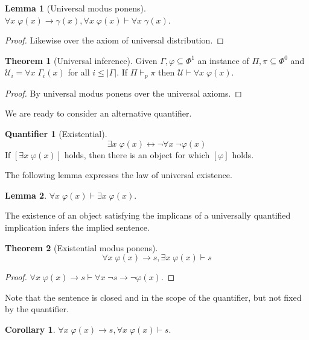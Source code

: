 \documentclass{amsbook}
\newcommand{\infers}{\mathrel\vdash}
\newcommand{\univ}[1]{\mathord\forall#1\;}
\newcommand{\exis}[1]{\mathord\exists#1\;}
\newcommand{\then}{\mathrel\rightarrow}
\newcommand{\eqv}{\mathrel\leftrightarrow}
\theoremstyle{definition}
\newtheorem{quant}{Quantifier}[chapter]
\newtheorem{thm}{Theorem}[section]
\newtheorem{lmm}{Lemma}[section]
\newtheorem{crl}{Corollary}[section]
\begin{document}
\begin{lmm}[Universal modus ponens]
    $\univ x \varphi(x) \then \gamma(x), \univ x \varphi(x) \infers \univ x \gamma(x)$.
    \begin{proof}
        Likewise over the axiom of universal distribution.
    \end{proof}
\end{lmm}

\begin{thm}[Universal inference]
    Given $\varGamma, \varphi \subseteq \Phi^1$ an instance of $\Pi, \pi \subseteq \Phi^0$ and $\mathcal U_i = \univ x \varGamma_i(x)$ for all $i \leq |\varGamma|$. If $\Pi \infers_p \pi$ then $\mathcal U \infers \univ x \varphi(x)$.
    \begin{proof}
        By universal modus ponens over the universal axioms.
    \end{proof}
\end{thm}

We are ready to consider an alternative quantifier.

\begin{quant}[Existential]
    $$\exis x \varphi(x) \eqv \neg\univ x \neg\varphi(x)$$
    If $\left[ \exis x \varphi(x) \right]$ holds, then there is an object for which $[\varphi]$ holds.
\end{quant}

The following lemma expresses the law of universal existence.

\begin{lmm}
    $\univ x \varphi(x) \infers \exis x \varphi(x)$.
\end{lmm}

The existence of an object satisfying the implicans of a universally quantified implication infers the implied sentence.

\begin{thm}[Existential modus ponens]
    $$\univ x \varphi(x) \then s, \exis x \varphi(x) \infers s$$
    \begin{proof}
        $\univ x \varphi(x) \then s \infers \univ x \neg s \then \neg\varphi(x)$.
    \end{proof}
\end{thm}

Note that the sentence is closed and in the scope of the quantifier, but not fixed by the quantifier.

\begin{crl}
    $\univ x \varphi(x) \then s, \univ x \varphi(x) \infers s$.
\end{crl}
\end{document}
